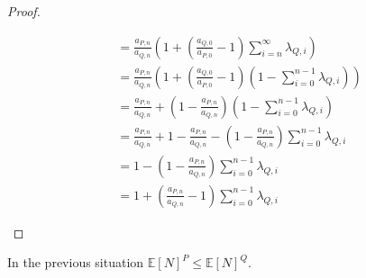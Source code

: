 \begin{proof}
\begin{enumerate}
\begin{align*}
        &= \frac{a_{P,n}}{a_{Q,n}}\left(1 + (\frac{a_{Q,0}}{a_{P,0}}-1)\sum_{i=n}^{\infty}\lambda_{Q,i}\right)\\
        &= \frac{a_{P,n}}{a_{Q,n}}\left(1 + (\frac{a_{Q,0}}{a_{P,0}}-1)(1-\sum_{i=0}^{n-1}\lambda_{Q,i})\right)\\
        &= \frac{a_{P,n}}{a_{Q,n}} + (1-\frac{a_{P,n}}{a_{Q,n}})(1-\sum_{i=0}^{n-1}\lambda_{Q,i})\\
        &= \frac{a_{P,n}}{a_{Q,n}} + 1 - \frac{a_{P,n}}{a_{Q,n}} - (1-\frac{a_{P,n}}{a_{Q,n}})\sum_{i=0}^{n-1}\lambda_{Q,i}\\
        &= 1 - (1-\frac{a_{P,n}}{a_{Q,n}})\sum_{i=0}^{n-1}\lambda_{Q,i}\\
        &= 1 + (\frac{a_{P,n}}{a_{Q,n}}-1)\sum_{i=0}^{n-1}\lambda_{Q,i}
    \end{align*}
  \end{enumerate}
\end{proof}

\begin{corollary}\label{cor:NumberInTheSystemSmaller}
  In the previous situation $\mathbb{E}[N]^P \leq \mathbb{E}[N]^Q$.
\end{corollary}

